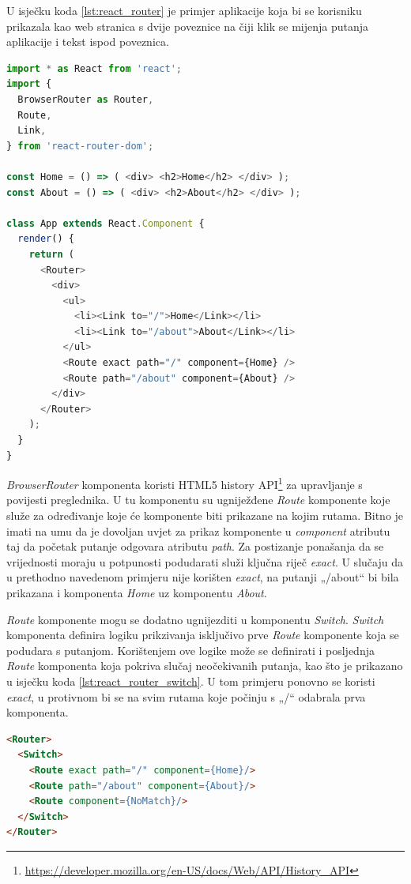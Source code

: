 \documentclass[times, utf8, diplomski, numeric]{fer}
\newcommand{\razmakp}{\vspace{18pt}}
\newcommand{\razmaks}{\vspace{10pt}}
\begin{document}
\razmakp

U isječku koda \ref{lst:react_router} je primjer aplikacije koja bi se korisniku prikazala kao web stranica s dvije poveznice na čiji klik se mijenja putanja aplikacije i tekst ispod poveznica.

\newpage %
\begin{lstlisting}[language=JavaScript, caption={Primjer korištenja React Router biblioteke}, label={lst:react_router}]
import * as React from 'react';
import {
  BrowserRouter as Router,
  Route,
  Link,
} from 'react-router-dom';

const Home = () => ( <div> <h2>Home</h2> </div> );
const About = () => ( <div> <h2>About</h2> </div> );

class App extends React.Component {
  render() {
    return (
      <Router>
        <div>
          <ul>
            <li><Link to="/">Home</Link></li>
            <li><Link to="/about">About</Link></li>
          </ul>
          <Route exact path="/" component={Home} />
          <Route path="/about" component={About} />
        </div>
      </Router>
    );
  }
}
\end{lstlisting}
\razmaks

\emph{BrowserRouter} komponenta koristi HTML5 history API\footnote{\url{https://developer.mozilla.org/en-US/docs/Web/API/History_API}} za upravljanje s povijesti preglednika.
U tu komponentu su ugniježđene \emph{Route} komponente koje služe za određivanje koje će komponente biti prikazane na kojim rutama.
Bitno je imati na umu da je dovoljan uvjet za prikaz komponente u \emph{component} atributu taj da početak putanje odgovara atributu \emph{path}.
Za postizanje ponašanja da se vrijednosti moraju u potpunosti podudarati služi ključna riječ \emph{exact}.
U slučaju da u prethodno navedenom primjeru nije korišten \emph{exact}, na putanji „/about“ bi bila prikazana i komponenta \emph{Home} uz komponentu \emph{About}.

\emph{Route} komponente mogu se dodatno ugnijezditi u komponentu \emph{Switch}.
\emph{Switch} komponenta definira logiku prikzivanja isključivo prve \emph{Route} komponente koja se podudara s putanjom.
Korištenjem ove logike može se definirati i posljednja \emph{Route} komponenta koja pokriva slučaj neočekivanih putanja, kao što je prikazano u isječku koda \ref{lst:react_router_switch}.
U tom primjeru ponovno se koristi \emph{exact}, u protivnom bi se na svim rutama koje počinju s „/“ odabrala prva komponenta.

\razmakp %
\begin{lstlisting}[language=html, caption={Primjer korištenja \emph{Switch}komponente}, label={lst:react_router_switch}]
<Router>
  <Switch>
    <Route exact path="/" component={Home}/>
    <Route path="/about" component={About}/>
    <Route component={NoMatch}/>
  </Switch>
</Router>
\end{lstlisting}
\razmaks
\end{document}
